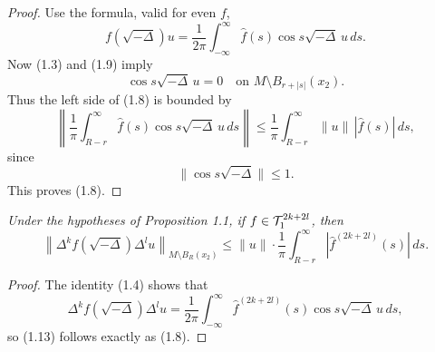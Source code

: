 \begin{proof}
Use the formula, valid for even $f$,
\begin{equation}\tag{1.10}
f(\sqrt{-\Delta})u = \frac{1}{2\pi} \int_{-\infty}^{\infty} \hat{f}(s)\cos s\sqrt{-\Delta}\,u\,ds.
\end{equation}
Now (1.3) and (1.9) imply
\begin{equation}\tag{1.11}
\cos s\sqrt{-\Delta}\,u = 0 \quad \text{on } M \setminus B_{r+|s|}(x_2).
\end{equation}
Thus the left side of (1.8) is bounded by
\[
\left\| \frac{1}{\pi} \int_{R-r}^{\infty} \hat{f}(s)\cos s\sqrt{-\Delta}\,u\,ds \right\|
\leq \frac{1}{\pi} \int_{R-r}^{\infty} \|u\|\,|\hat{f}(s)|\,ds,
\]
since
\begin{equation}\tag{1.12}
\|\cos s\sqrt{-\Delta}\| \leq 1.
\end{equation}
This proves (1.8).
\end{proof}

\begin{corollary}
\label{cor:derivative-tail-estimate}
\textit{Under the hypotheses of Proposition 1.1, if $f \in \mathcal{T}_1^{2k+2l}$, then}
\begin{equation}\tag{1.13}
\left\| \Delta^k f(\sqrt{-\Delta}) \Delta^l u \right\|_{M \setminus B_R(x_2)}
\leq \|u\| \cdot \frac{1}{\pi} \int_{R-r}^{\infty} \left|\hat{f}^{(2k+2l)}(s)\right|\, ds.
\end{equation}
\end{corollary}

\begin{proof}
The identity (1.4) shows that
\begin{equation}\tag{1.14}
\Delta^k f(\sqrt{-\Delta}) \Delta^l u
= \frac{1}{2\pi} \int_{-\infty}^{\infty} \hat{f}^{(2k+2l)}(s)\cos s\sqrt{-\Delta}\,u\,ds,
\end{equation}
so (1.13) follows exactly as (1.8).
\end{proof}

